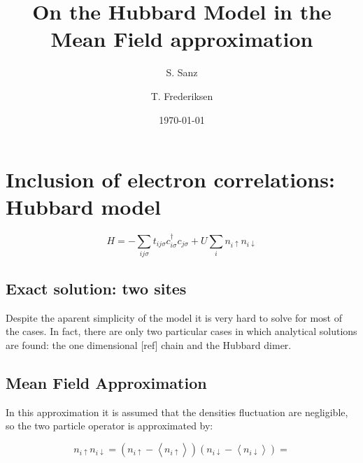 \documentclass[amsmath,%
amssymb,prb,superscriptaddress]{revtex4}
\begin{document}
\title{On the Hubbard Model in the Mean Field approximation}

\author{S. Sanz}

\author{T. Frederiksen}

\date{\today}



\maketitle 


\section{Inclusion of electron correlations: Hubbard model}

\begin{equation}\label{eq:Hubbard_Hamiltonian}
H = -\sum_{ij\sigma}t_{ij\sigma}c^{\dagger}_{i\sigma}c_{j\sigma} + U\sum_{i}n_{i\uparrow}n_{i\downarrow}
\end{equation}

\subsection{Exact solution: two sites}
Despite the aparent simplicity of the model it is very hard to solve for most of the cases. In fact, there are only two particular cases in which analytical solutions are found: the one dimensional [ref] chain and the Hubbard dimer.
 


\subsection{Mean Field Approximation}

In this approximation it is assumed that the densities fluctuation are negligible, so the two particle operator is approximated by:

\begin{equation}
n_{i\uparrow}n_{i\downarrow} = \left(n_{i\uparrow} - \left\langle n_{i\uparrow}\right\rangle \right)\left( n_{i\downarrow} - \left\langle n_{i\downarrow}\right\rangle  \right) =
\end{equation}
\end{document}
